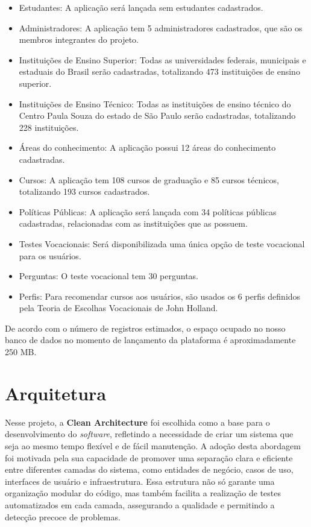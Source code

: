 \begin{itemize}
\item Estudantes: A aplicação será lançada sem estudantes cadastrados.
\item Administradores: A aplicação tem 5 administradores cadastrados, que são os membros integrantes do projeto.
\item Instituições de Ensino Superior: Todas as universidades federais, municipais e estaduais do Brasil serão cadastradas, totalizando 473 instituições de ensino superior.
\item Instituições de Ensino Técnico: Todas as instituições de ensino técnico do Centro Paula Souza do estado de São Paulo serão cadastradas, totalizando 228 instituições. 
\item Áreas do conhecimento: A aplicação possui 12 áreas do conhecimento cadastradas. 
\item Cursos: A aplicação tem 108 cursos de graduação e 85 cursos técnicos, totalizando 193 cursos cadastrados. 
\item Políticas Públicas: A aplicação será lançada com 34 políticas públicas cadastradas, relacionadas com as instituições que as possuem.
\item Testes Vocacionais: Será disponibilizada uma única opção de teste vocacional para os usuários.
\item Perguntas: O teste vocacional tem 30 perguntas.
\item Perfis: Para recomendar cursos aos usuários, são usados os 6 perfis definidos pela Teoria de Escolhas Vocacionais de John Holland.
\end{itemize}

De acordo com o número de registros estimados, o espaço ocupado no nosso banco de dados no momento de lançamento da plataforma é aproximadamente 250 MB. 


\section{Arquitetura}

Nesse projeto, a \textbf{Clean Architecture} foi escolhida como a base para o desenvolvimento do \textit{software}, refletindo a necessidade de criar um sistema que seja ao mesmo tempo flexível e de fácil manutenção. A adoção desta abordagem foi motivada pela sua capacidade de promover uma separação clara e eficiente entre diferentes camadas do sistema, como entidades de negócio, casos de uso, interfaces de usuário e infraestrutura. Essa estrutura não só garante uma organização modular do código, mas também facilita a realização de testes automatizados em cada camada, assegurando a qualidade e permitindo a detecção precoce de problemas.

